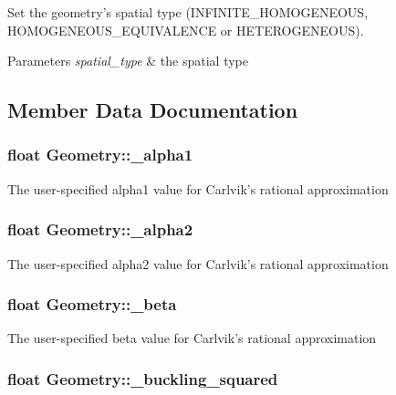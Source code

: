 Set the geometry's spatial type (I\-N\-F\-I\-N\-I\-T\-E\-\_\-\-H\-O\-M\-O\-G\-E\-N\-E\-O\-U\-S, H\-O\-M\-O\-G\-E\-N\-E\-O\-U\-S\-\_\-\-E\-Q\-U\-I\-V\-A\-L\-E\-N\-C\-E or H\-E\-T\-E\-R\-O\-G\-E\-N\-E\-O\-U\-S). 


\begin{DoxyParams}{Parameters}
{\em spatial\-\_\-type} & the spatial type \\
\hline
\end{DoxyParams}


\subsection{Member Data Documentation}
\hypertarget{classGeometry_a29007358759f00d89a8544539bfb7b75}{
\subsubsection[{\-\_\-alpha1}]{\setlength{\rightskip}{0pt plus 5cm}float Geometry\-::\-\_\-alpha1\hspace{0.3cm}{\ttfamily [private]}}}\label{classGeometry_a29007358759f00d89a8544539bfb7b75}
The user-\/specified alpha1 value for Carlvik's rational approximation \hypertarget{classGeometry_a36642c1914426a3bdbcb291497e2c7f8}{
\subsubsection[{\-\_\-alpha2}]{\setlength{\rightskip}{0pt plus 5cm}float Geometry\-::\-\_\-alpha2\hspace{0.3cm}{\ttfamily [private]}}}\label{classGeometry_a36642c1914426a3bdbcb291497e2c7f8}
The user-\/specified alpha2 value for Carlvik's rational approximation \hypertarget{classGeometry_a20733d493193d7c75ad9afb454046324}{
\subsubsection[{\-\_\-beta}]{\setlength{\rightskip}{0pt plus 5cm}float Geometry\-::\-\_\-beta\hspace{0.3cm}{\ttfamily [private]}}}\label{classGeometry_a20733d493193d7c75ad9afb454046324}
The user-\/specified beta value for Carlvik's rational approximation \hypertarget{classGeometry_aa4c62b0931b1a51effdec42a28e9088f}{
\subsubsection[{\-\_\-buckling\-\_\-squared}]{\setlength{\rightskip}{0pt plus 5cm}float Geometry\-::\-\_\-buckling\-\_\-squared\hspace{0.3cm}{\ttfamily [private]}}}\label{classGeometry_aa4c62b0931b1a51effdec42a28e9088f}
